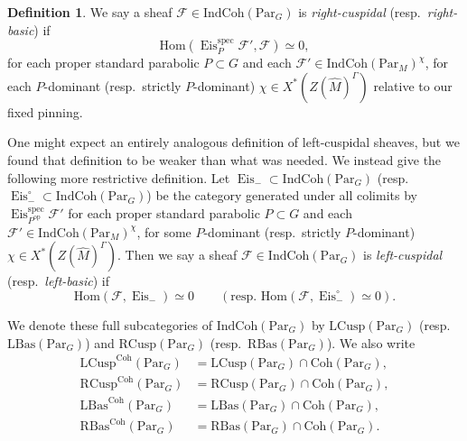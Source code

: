 \documentclass{amsart}
\theoremstyle{definition}
\newtheorem{definition}[theorem]{Definition}
\theoremstyle{remark}
\numberwithin{equation}{section}
\newcommand{\mc}{\mathcal}
\newcommand{\Hom}{\mathrm{Hom}}
\newcommand{\spec}{\mathrm{spec}}
\newcommand{\op}{\mathrm{op}}
\newcommand{\wh}{\widehat}
\newcommand{\Par}{\mathrm{Par}}
\newcommand{\IndCoh}{\mathrm{IndCoh}}
\DeclareMathOperator{\Eis}{\mathrm{Eis}}
\newcommand{\Coh}{\mathrm{Coh}}
\newcommand{\LCusp}{\mathrm{LCusp}}
\newcommand{\RCusp}{\mathrm{RCusp}}
\newcommand{\RBas}{\mathrm{RBas}}
\newcommand{\LBas}{\mathrm{LBas}}
\begin{document}
\begin{definition}{\label{def: cuspdef}}
    We say a sheaf $\mc{F} \in \IndCoh(\Par_G)$ is \emph{right-cuspidal} (resp.~\emph{right-basic}) if 
    \begin{equation*}
       \Hom(\Eis^{\spec}_{P} \mc{F}', \mc{F})\simeq 0,
    \end{equation*}
    for each proper standard parabolic $P \subset G$ and each $\mc{F}' \in \IndCoh(\Par_M)^\chi$, for each $P$-dominant (resp.~strictly $P$-dominant) $\chi \in X^*(Z(\wh{M})^{\Gamma})$ relative to our fixed pinning. 

   One might expect an entirely analogous definition of left-cuspidal sheaves, but we found that definition to be weaker than what was needed. We instead give the following more restrictive definition. Let $\Eis_- \subset \IndCoh(\Par_G)$ (resp.~$\Eis^{\circ}_- \subset \IndCoh(\Par_G)$)  be the category generated under all colimits by $\Eis^{\spec}_{P^{\op}} \mc{F}'$ for each proper standard parabolic $P \subset G$ and each $\mc{F}' \in \IndCoh(\Par_M)^{\chi}$, for some $P$-dominant (resp.~strictly $P$-dominant) $\chi \in X^*(Z(\wh{M})^{\Gamma})$. Then we say a sheaf $\mc{F} \in \IndCoh(\Par_G)$ is \emph{left-cuspidal} (resp.~\emph{left-basic}) if 
    \begin{equation*}
        \Hom(\mc{F}, \Eis_-) \simeq 0 \qquad \left(\text{resp.~}\Hom(\mc{F}, \Eis^{\circ}_-) \simeq 0\right).
    \end{equation*}
    
 We denote these full subcategories of $\IndCoh(\Par_G)$ by $\LCusp(\Par_G)$ (resp.~$\LBas(\Par_G)$) and $\RCusp(\Par_G)$ (resp.~$\RBas(\Par_G)$). 
 We also write
 \begin{align*}
 \LCusp^{\Coh}(\Par_G)&=\LCusp(\Par_G) \cap \Coh(\Par_G), \\ 
\RCusp^{\Coh}(\Par_G)&=\RCusp(\Par_G) \cap \Coh(\Par_G), \\
\LBas^{\Coh}(\Par_G)&=\LBas(\Par_G) \cap \Coh(\Par_G), \\
 \RBas^{\Coh}(\Par_G)&=\RBas(\Par_G) \cap \Coh(\Par_G).     
 \end{align*}
\end{definition}
\end{document}

